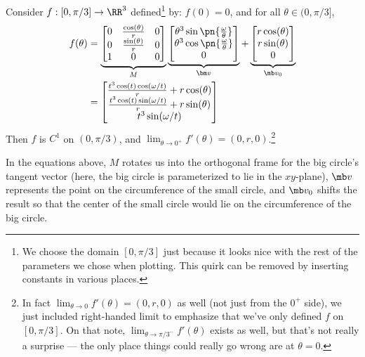 \begin{proposition}
  Consider $f : [0, \pi/3] \to \RR^3$ defined\footnote{We choose the
    domain $[0, \pi/3]$ just because it looks nice with the rest of
    the parameters we chose when plotting. This quirk can be removed
    by inserting constants in various places.} by: $f(0) = 0$, and for
  all $\theta \in (0, \pi/3]$,
  \begin{align*}
    f(\theta) &=
                \underbrace{
    \begin{bmatrix}
      0 & \frac{\cos(\theta)}{r} & 0 \\
      0 & \frac{\sin(\theta)}{r} & 0 \\
      1 & 0 & 0
    \end{bmatrix}}_{M}
              \underbrace{
    \begin{bmatrix}
      \theta^3\sin\pn{\frac{\omega}{\theta}} \\
      \theta^3\cos\pn{\frac{\omega}{\theta}} \\
      0
    \end{bmatrix}}_{\bm v} +
    \underbrace{
    \begin{bmatrix}
      r \cos(\theta) \\
      r \sin(\theta) \\
      0
    \end{bmatrix}}_{\mb v_0} \\
    &=
      \begin{bmatrix}
        \frac{t^3 \cos(t) \cos(\omega/t)}{r} + r\cos(\theta) \\
        \frac{t^3 \cos(t) \sin(\omega/t)}{r} + r\sin(\theta) \\
        t^3 \sin(\omega/t)
      \end{bmatrix}
  \end{align*}
  Then $f$ is $C^1$ on $(0,\pi/3)$, and $\lim_{\theta\to 0^+}
  f'(\theta) = (0,r,0)$.\footnote{In fact $\lim_{\theta \to 0}
    f'(\theta) = (0,r,0)$ as well (not just from the $0^+$ side), we
    just included right-handed limit to emphasize that we've only
    defined $f$ on $[0,\pi/3]$. On that note, $\lim_{\theta\to
      \pi/3^-} f'(\theta)$ exists as well, but that's not really a
    surprise --- the only place things could really go wrong are at
    $\theta = 0$.}
\end{proposition}
\begin{remark}
  In the equations above, $M$ rotates us into the orthogonal frame for
  the big circle's tangent vector (here, the big circle is
  parameterized to lie in the $xy$-plane), $\mb v$ represents the
  point on the circumference of the small circle, and $\mb v_0$ shifts
  the result so that the center of the small circle would lie on the
  circumference of the big circle.
\end{remark}
